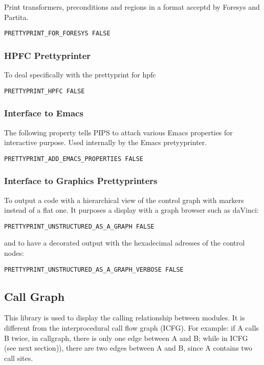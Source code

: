 Print transformers, preconditions and regions in a format acceptd by
Foresys and Partita.

\begin{verbatim}
PRETTYPRINT_FOR_FORESYS FALSE
\end{verbatim}

\subsubsection{HPFC Prettyprinter}

To deal specifically with the prettyprint for hpfc

\begin{verbatim}
PRETTYPRINT_HPFC FALSE
\end{verbatim}


\subsubsection{Interface to Emacs}

The following property tells PIPS to attach various Emacs properties
for interactive purpose. Used internally by the Emacs pretyyprinter.
\begin{verbatim}
PRETTYPRINT_ADD_EMACS_PROPERTIES FALSE
\end{verbatim}


\subsubsection{Interface to Graphics Prettyprinters}

To output a code with a hierarchical view of the control graph with
markers instead of a flat one. It purposes a display with a graph
browser such as daVinci:

\begin{verbatim}
PRETTYPRINT_UNSTRUCTURED_AS_A_GRAPH FALSE
\end{verbatim}

and to have a decorated output with the hexadecimal adresses of the
control nodes:
\begin{verbatim}
PRETTYPRINT_UNSTRUCTURED_AS_A_GRAPH_VERBOSE FALSE
\end{verbatim}

\subsection{Call Graph}

This library is used to display the calling relationship between
modules.  It is different from the interprocedural call flow graph
(ICFG). For  example: if A calls B twice, in
callgraph, there is only one edge between A and B; while in ICFG (see
next section)), there are two edges between A and B, since A contains
two call sites.  

